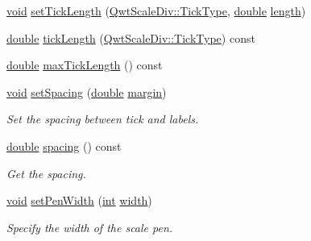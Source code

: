\begin{DoxyCompactItemize}
\item 
\hyperlink{group___u_a_v_objects_plugin_ga444cf2ff3f0ecbe028adce838d373f5c}{void} \hyperlink{class_qwt_abstract_scale_draw_a7fed388e435aae791d61f48cc9ddf632}{set\-Tick\-Length} (\hyperlink{class_qwt_scale_div_af21aedaa886dd5e067cf63505838736c}{Qwt\-Scale\-Div\-::\-Tick\-Type}, \hyperlink{_super_l_u_support_8h_a8956b2b9f49bf918deed98379d159ca7}{double} \hyperlink{glext_8h_a3c8469415bbc83dd1341af15c67f1cef}{length})
\item 
\hyperlink{_super_l_u_support_8h_a8956b2b9f49bf918deed98379d159ca7}{double} \hyperlink{class_qwt_abstract_scale_draw_aa43034f7ad87c33e9790c730ed48c55d}{tick\-Length} (\hyperlink{class_qwt_scale_div_af21aedaa886dd5e067cf63505838736c}{Qwt\-Scale\-Div\-::\-Tick\-Type}) const 
\item 
\hyperlink{_super_l_u_support_8h_a8956b2b9f49bf918deed98379d159ca7}{double} \hyperlink{class_qwt_abstract_scale_draw_afac6ad0e98fefd9d103366726542a055}{max\-Tick\-Length} () const 
\item 
\hyperlink{group___u_a_v_objects_plugin_ga444cf2ff3f0ecbe028adce838d373f5c}{void} \hyperlink{class_qwt_abstract_scale_draw_ae5bdaadb303510f7eb9dbec5c52f7a47}{set\-Spacing} (\hyperlink{_super_l_u_support_8h_a8956b2b9f49bf918deed98379d159ca7}{double} \hyperlink{fancylineedit_8cpp_a0fa6e789ab8d8c920f2104ee8c183196a9c8c6ada5d0208410d9bb9a14780df36}{margin})
\begin{DoxyCompactList}\small\item\em Set the spacing between tick and labels. \end{DoxyCompactList}\item 
\hyperlink{_super_l_u_support_8h_a8956b2b9f49bf918deed98379d159ca7}{double} \hyperlink{class_qwt_abstract_scale_draw_a93561d85e879402086f2607e45e89cc2}{spacing} () const 
\begin{DoxyCompactList}\small\item\em Get the spacing. \end{DoxyCompactList}\item 
\hyperlink{group___u_a_v_objects_plugin_ga444cf2ff3f0ecbe028adce838d373f5c}{void} \hyperlink{class_qwt_abstract_scale_draw_a098e1f813077c9bb0c5f83266035943a}{set\-Pen\-Width} (\hyperlink{ioapi_8h_a787fa3cf048117ba7123753c1e74fcd6}{int} \hyperlink{glext_8h_a76aaa5c50746272e7d2de9aece921757}{width})
\begin{DoxyCompactList}\small\item\em Specify the width of the scale pen. \end{DoxyCompactList}\item 

\end{DoxyCompactItemize}
